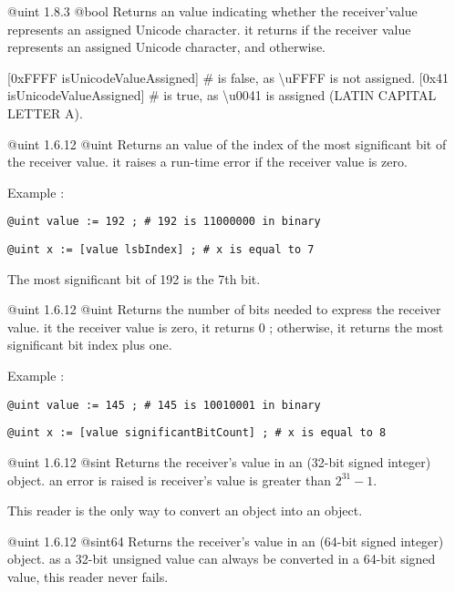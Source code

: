 {@uint}
{1.8.3}
{@bool}
{Returns an  value indicating whether the receiver'value represents an assigned Unicode character.}
{it returns  if the receiver value represents an assigned Unicode character,  and otherwise.}

\exempleDeuxLignes
{[0xFFFF isUnicodeValueAssigned] \# is false, as \textbackslash uFFFF is not assigned.}
{[0x41 isUnicodeValueAssigned] \# is true, as \textbackslash u0041 is assigned (LATIN CAPITAL LETTER A).}



{@uint}
{1.6.12}
{@uint}
{Returns an  value of the index of the most significant bit of the receiver value.}
{it raises a run-time error if the receiver value is zero.}

Example :

\texttt{@uint value := 192 ; \# 192 is 11000000 in binary}

\texttt{@uint x := [value lsbIndex] ; \# x is equal to 7}

The most significant bit of 192 is the 7th bit.




{@uint}
{1.6.12}
{@uint}
{Returns the number of bits needed to express the receiver value.}
{it the receiver value is zero, it returns 0 ; otherwise, it returns the most significant bit index plus one.}

Example :

\texttt{@uint value := 145 ; \# 145 is 10010001 in binary}

\texttt{@uint x := [value significantBitCount] ; \# x is equal to 8}





{@uint}
{1.6.12}
{@sint}
{Returns the receiver's value in an  (32-bit signed integer) object.}
{an error is raised is receiver's value is greater than $2^{31}-1$.}

This reader is the only way to convert an  object into an  object.




{@uint}
{1.6.12}
{@sint64}
{Returns the receiver's value in an  (64-bit signed integer) object.}
{as a 32-bit unsigned value can always be converted in a 64-bit signed value, this reader never fails.}

